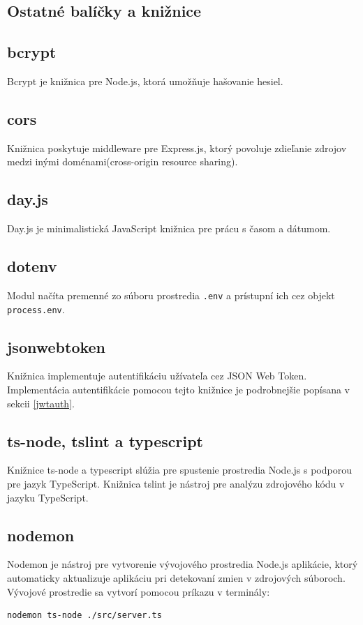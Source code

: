 \subsection{Ostatné balíčky a knižnice}
\subsection*{bcrypt}
Bcrypt je knižnica pre Node.js, ktorá umožňuje hašovanie hesiel.

\subsection*{cors}
Knižnica poskytuje middleware pre Express.js, ktorý povoluje zdieľanie zdrojov medzi inými doménami(cross-origin resource sharing).

\subsection*{day.js}
Day.js je minimalistická JavaScript knižnica pre prácu s časom a dátumom.

\subsection*{dotenv}
Modul načíta premenné zo súboru prostredia \texttt{.env} a prístupní ich cez objekt \texttt{process.env}.

\subsection*{jsonwebtoken}
Knižnica implementuje autentifikáciu užívateľa cez JSON Web Token. Implementácia autentifikácie pomocou tejto knižnice je podrobnejšie popísana v sekcii \ref{jwtauth}.

\subsection*{ts-node, tslint a typescript}
Knižnice ts-node a typescript slúžia pre spustenie prostredia Node.js s podporou pre jazyk TypeScript. Knižnica tslint je nástroj pre analýzu zdrojového kódu v jazyku TypeScript.

\subsection*{nodemon}
Nodemon je nástroj pre vytvorenie vývojového prostredia Node.js aplikácie, ktorý automaticky aktualizuje aplikáciu pri detekovaní zmien v zdrojových súboroch. Vývojové prostredie sa vytvorí pomocou príkazu v terminály:
\begin{verbatim}nodemon ts-node ./src/server.ts
\end{verbatim}
